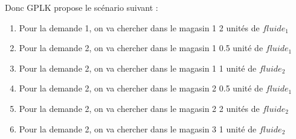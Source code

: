 Donc GPLK propose le scénario suivant :
\begin{enumerate}

\item Pour la demande 1, on va chercher dans le magasin 1 2 unités de $fluide_1$
\item Pour la demande 2, on va chercher dans le magasin 1 0.5 unité de $fluide_1$
\item Pour la demande 2, on va chercher dans le magasin 1 1 unité de $fluide_2$
\item Pour la demande 2, on va chercher dans le magasin 2 0.5 unité de $fluide_1$
\item Pour la demande 2, on va chercher dans le magasin 2 2 unités de $fluide_2$
\item Pour la demande 2, on va chercher dans le magasin 3 1 unité de $fluide_2$
\end{enumerate}

